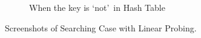 \begin{itemize}
\begin{figure}[!ht]
\begin{subfigure}{0.45\textwidth}
			      \caption{When the key is `not'~in Hash Table}\label{fig:linearprobing-notfound-metric}
		      \end{subfigure}

		      \caption{Screenshots of Searching Case with Linear Probing.}\label{fig:linearprobing-search-metric}
	      \end{figure}
\end{itemize}